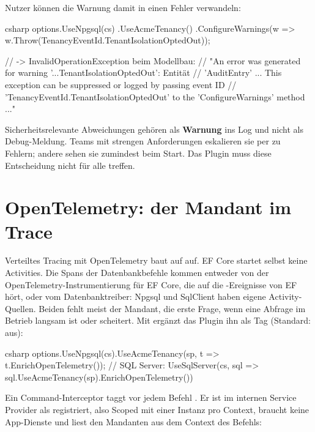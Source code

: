 Nutzer können die Warnung damit in einen Fehler verwandeln:

\begin{sourcecode}[Anwendung]{csharp}
options.UseNpgsql(cs)
       .UseAcmeTenancy()
       .ConfigureWarnings(w => w.Throw(TenancyEventId.TenantIsolationOptedOut));

// -> InvalidOperationException beim Modellbau:
//    "An error was generated for warning '...TenantIsolationOptedOut': Entität
//     'AuditEntry' ... This exception can be suppressed or logged by passing event ID
//     'TenancyEventId.TenantIsolationOptedOut' to the 'ConfigureWarnings' method ..."
\end{sourcecode}

\begin{tip}
  Sicherheitsrelevante Abweichungen gehören als \textbf{Warnung} ins Log und nicht als
  Debug-Meldung. Teams mit strengen Anforderungen eskalieren sie per
   zu Fehlern; andere sehen sie zumindest beim Start.
  Das Plugin muss diese Entscheidung nicht für alle treffen.
\end{tip}

\section{OpenTelemetry: der Mandant im Trace}

Verteiltes Tracing mit OpenTelemetry baut auf
 auf. EF Core startet selbst keine
Activities. Die Spans der Datenbankbefehle kommen entweder von der OpenTelemetry-Instrumentierung
für EF Core, die auf die -Ereignisse von EF hört, oder vom
Datenbanktreiber: Npgsql und SqlClient haben eigene Activity-Quellen. Beiden fehlt meist der
Mandant, die erste Frage, wenn eine Abfrage im Betrieb langsam ist oder scheitert. Mit
 ergänzt das Plugin ihn als
Tag  (Standard: aus):

\begin{sourcecode}[Aufruf]{csharp}
options.UseNpgsql(cs).UseAcmeTenancy(sp, t => t.EnrichOpenTelemetry());
// SQL Server: UseSqlServer(cs, sql => sql.UseAcmeTenancy(sp).EnrichOpenTelemetry())
\end{sourcecode}

Ein Command-Interceptor taggt vor jedem Befehl . Er ist im
internen Service Provider als  registriert, also Scoped mit einer Instanz pro
Context, braucht keine App-Dienste und liest den Mandanten aus dem Context des Befehls:


